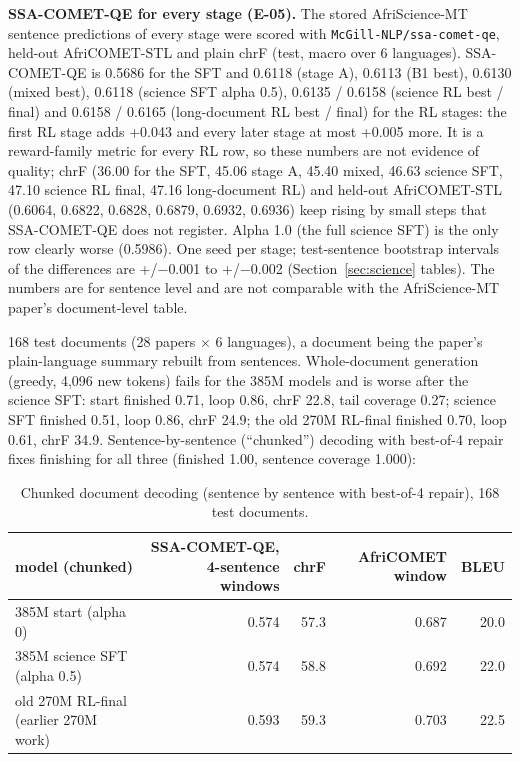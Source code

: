 \textbf{SSA-COMET-QE for every stage (E-05).} The stored AfriScience-MT sentence predictions of every stage were scored with \texttt{McGill-\allowbreak{}NLP/\allowbreak{}ssa-\allowbreak{}comet-\allowbreak{}qe}, held-out AfriCOMET-STL and plain chrF (test, macro over 6 languages). SSA-COMET-QE is 0.5686 for the SFT and 0.6118 (stage A), 0.6113 (B1 best), 0.6130 (mixed best), 0.6118 (science SFT alpha 0.5), 0.6135 / 0.6158 (science RL best / final) and 0.6158 / 0.6165 (long-document RL best / final) for the RL stages: the first RL stage adds +0.043 and every later stage at most +0.005 more. It is a reward-family metric for every RL row, so these numbers are not evidence of quality; chrF (36.00 for the SFT, 45.06 stage A, 45.40 mixed, 46.63 science SFT, 47.10 science RL final, 47.16 long-document RL) and held-out AfriCOMET-STL (0.6064, 0.6822, 0.6828, 0.6879, 0.6932, 0.6936) keep rising by small steps that SSA-COMET-QE does not register. Alpha 1.0 (the full science SFT) is the only row clearly worse (0.5986). One seed per stage; test-sentence bootstrap intervals of the differences are +/\ensuremath{-}0.001 to +/\ensuremath{-}0.002 (Section~\ref{sec:science} tables). The numbers are for sentence level and are not comparable with the AfriScience-MT paper's document-level table. 

168 test documents (28 papers $\times$ 6 languages), a document being the paper's plain-language summary rebuilt from sentences. Whole-document generation (greedy, 4,096 new tokens) fails for the 385M models and is worse after the science SFT: start finished 0.71, loop 0.86, chrF 22.8, tail coverage 0.27; science SFT finished 0.51, loop 0.86, chrF 24.9; the old 270M RL-final finished 0.70, loop 0.61, chrF 34.9. Sentence-by-sentence (``chunked'') decoding with best-of-4 repair fixes finishing for all three (finished 1.00, sentence coverage 1.000): 

\begin{table}[t]
\centering\footnotesize
\setlength{\tabcolsep}{4pt}
\caption{Chunked document decoding (sentence by sentence with best-of-4 repair), 168 test documents.}\label{tab:docs}
\begin{tabularx}{\linewidth}{@{}>{\raggedright\arraybackslash}Xrrrr@{}}
\toprule
model (chunked) & SSA-COMET-QE, 4-sentence windows & chrF & AfriCOMET window & BLEU \\
\midrule
385M start (alpha 0) & 0.574 & 57.3 & 0.687 & 20.0 \\
385M science SFT (alpha 0.5) & 0.574 & 58.8 & 0.692 & 22.0 \\
old 270M RL-final (earlier 270M work) & 0.593 & 59.3 & 0.703 & 22.5 \\
\bottomrule
\end{tabularx}
\end{table}

